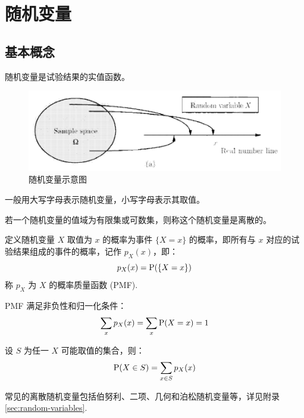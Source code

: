 \section{随机变量}

\subsection{基本概念}

\begin{definition}[随机变量]
随机变量是试验结果的实值函数。
\begin{figure}[H]
    \centering
    \includegraphics[width=0.65\linewidth]{figs/随机变量示意图.png}
    \caption{随机变量示意图}
    \label{fig:random-variable}
\end{figure}
\end{definition}
\begin{com}
一般用大写字母表示随机变量，小写字母表示其取值。
\end{com}

\begin{definition}[离散随机变量]
若一个随机变量的值域为有限集或可数集，则称这个随机变量是离散的。
\end{definition}

\begin{definition}[概率质量函数]
定义随机变量 $X$ 取值为 $x$ 的概率为事件 $\{X=x\}$ 的概率，即所有与 $x$ 对应的试验结果组成的事件的概率，记作 $p_X(x)$，即：
\[p_X(x)=\mathrm{P}(\{X=x\})\]
称 $p_X$ 为 $X$ 的概率质量函数 (PMF).
\end{definition}

\begin{property}
PMF 满足非负性和归一化条件：
\[\sum_x p_X(x)=\sum_x\mathrm{P}(X=x)=1\]
\end{property}
\begin{property}
设 $S$ 为任一 $X$ 可能取值的集合，则：
\[\mathrm{P}(X\in S)=\sum_{x\in S}p_X(x)\]
\end{property}

\begin{example}
常见的离散随机变量包括伯努利、二项、几何和泊松随机变量等，详见附录 \ref{sec:random-variables}.
\end{example}

